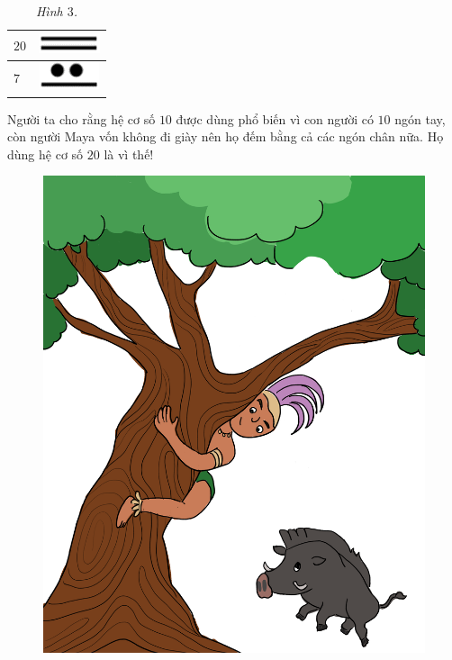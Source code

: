 \begin{multicols}{2}
\begin{table}[H]
\begin{tabular}{|l|c|}
			\hline
			$20$ & \includegraphics[scale=0.3]{35}\\
			\hline
			$7$& \includegraphics[scale=0.3]{36.png}\\
			\hline
		\end{tabular}
		\caption{\small\textit{\color{toancuabi}Hình $3$.}}
		\vspace*{-10pt}
	\end{table}
	Người ta cho rằng hệ cơ số $10$ được dùng phổ biến vì con người có $10$ ngón tay, còn người Maya vốn không đi giày nên họ đếm bằng cả các ngón chân nữa. Họ dùng hệ cơ số $20$ là vì thế!
	\begin{figure}[H]
		\centering
		\vspace*{-5pt}
		\captionsetup{labelformat= empty, justification=centering}
		\includegraphics[width=1\linewidth]{20.12-pi.4-2}

\end{figure}
\end{multicols}
